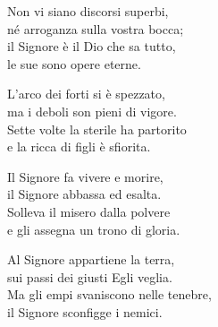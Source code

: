 

\spazio

\strofa Non vi siano discorsi superbi,\\
né arroganza sulla vostra bocca;\\
il Signore è il Dio che sa tutto,\\
le sue sono opere eterne.

\spazio


\spazio

\strofa L'arco dei forti si è spezzato,\\
ma i deboli son pieni di vigore.\\
Sette volte la sterile ha partorito\\
e la ricca di figli è sfiorita.

\spazio


\spazio

\strofa Il Signore fa vivere e morire,\\
il Signore abbassa ed esalta.\\
Solleva il misero dalla polvere\\
e gli assegna un trono di gloria.

\spazio


\spazio

\strofa Al Signore appartiene la terra,\\
sui passi dei giusti Egli veglia.\\
Ma gli empi svaniscono nelle tenebre,\\
il Signore sconfigge i nemici.

\spazio

